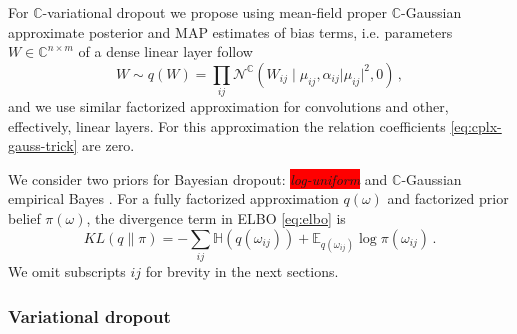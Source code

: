 \documentclass[a4paper,10pt]{article}
\newcommand{\cplx}{\mathbb{C}}
\newcommand{\verify}[1]{\textit{\!\colorbox{red}{#1}\!}}
\begin{document}
For $\cplx$-variational dropout we propose using mean-field proper $\cplx$-Gaussian approximate
posterior and MAP estimates of bias terms, i.e. parameters $W \in \cplx^{n\times m}$ of a dense
linear layer follow
\begin{equation}  \label{eq:c-gauss-vi}
  W \sim q(W)
    = \prod_{ij} \mathcal{N}^{\cplx}(
      W_{ij} \mid
        \mu_{ij},
        \alpha_{ij} \lvert \mu_{ij} \rvert^2,
        0
    )
  \,,
\end{equation}
and we use similar factorized approximation for convolutions and other, effectively, linear
layers. For this approximation the relation coefficients \eqref{eq:cplx-gauss-trick} are
zero.

We consider two priors for Bayesian dropout: \verify{log-uniform} and $\cplx$-Gaussian empirical
Bayes \citep{kingma_variational_2015,molchanov_variational_2017,kharitonov_variational_2018}.
For a fully factorized approximation $q(\omega)$ and factorized prior belief $\pi(\omega)$,
the divergence term in ELBO \eqref{eq:elbo} is
\begin{equation}  \label{eq:elbo-general-kl-div}
  KL(q \| \pi)
    = - \sum_{ij}
        \mathbb{H}(q(\omega_{ij}))
        + \mathbb{E}_{q(\omega_{ij})} \log{\pi(\omega_{ij})}
    \,.
\end{equation}
We omit subscripts ${ij}$ for brevity in the next sections.

\subsubsection{Variational dropout} %
\label{ssub:variational_dropout}
\end{document}

